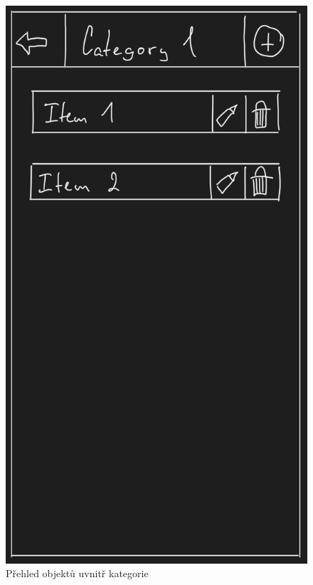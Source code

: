 \documentclass[12pt, titlepage]{article}
\begin{document}
\begin{figure}[ht]
	\centering
	\includegraphics[scale=0.43]{category_view}
	\caption{Přehled objektů uvnitř kategorie}
	\label{fig:category_view}
\end{figure}
\end{document}
